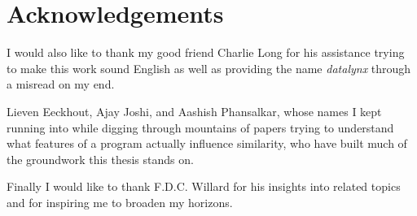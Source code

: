 \documentclass[bachelor_paper.tex]{subfiles}
\begin{document}
\section*{Acknowledgements}
    \label{chap:acknowledgements}
    \thispagestyle{empty}
    
    I would also like to thank my good friend Charlie Long for his assistance trying to make this work sound English as well as providing the name \emph{datalynx} through a misread on my end.

    Lieven Eeckhout, Ajay Joshi, and Aashish Phansalkar, whose names I kept running into while digging through mountains of papers trying to understand what features of a program actually influence similarity, who have built much of the groundwork this thesis stands on.

    Finally I would like to thank F.D.C. Willard for his insights into related topics and for inspiring me to broaden my horizons.
\end{document}
